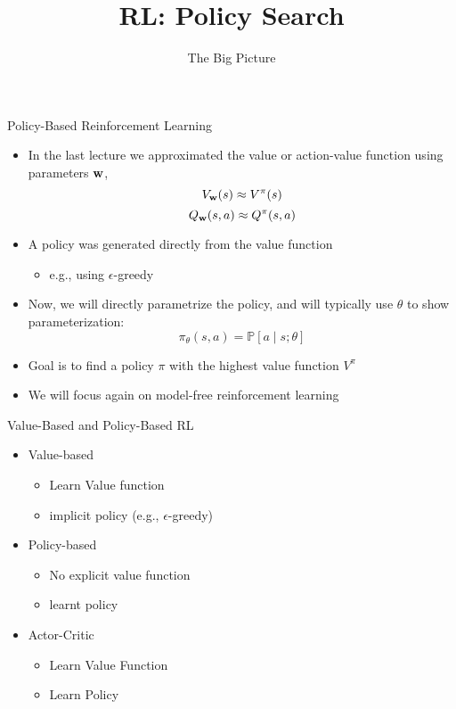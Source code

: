 \documentclass[aspectratio=169]{../latex_main/tntbeamer}  %
\title[RL: Big Picture]{RL: Policy Search}
\subtitle{The Big Picture}
\begin{document}
	
	\maketitle

\begin{frame}[c]{Policy-Based Reinforcement Learning}

\begin{itemize}
	\item In the last lecture we approximated the value or action-value function
	using parameters $\mathbf{w}$,
	$$V_{\mathbf{w}}(s) \approx V^\pi(s)$$
	$$Q_{\mathbf{w}}(s,a) \approx Q^\pi (s,a) $$
	\item A policy was generated directly from the value function
	\begin{itemize}
		\item e.g., using $\epsilon$-greedy
	\end{itemize}	
	\item Now, we will directly parametrize the policy, and will typically
	use $\theta$ to show parameterization:
	$$\pi_\theta (s,a) = \mathbb{P}[ a\mid s; \theta] $$
	\item Goal is to find a policy $\pi$ with the highest value function $V^\pi$
	\item We will focus again on model-free reinforcement learning
\end{itemize}

\end{frame}
\begin{frame}[c]{Value-Based and Policy-Based RL}

	\begin{itemize}
		\item Value-based
		\begin{itemize}
			\item Learn Value function
			\item implicit policy (e.g., $\epsilon$-greedy)
		\end{itemize}
		\item Policy-based
		\begin{itemize}
			\item No explicit value function
			\item learnt policy
		\end{itemize}
		\item Actor-Critic
		\begin{itemize}
			\item Learn Value Function
			\item Learn Policy
		\end{itemize}
		
	\end{itemize}		
	
\end{frame}
\end{document}
